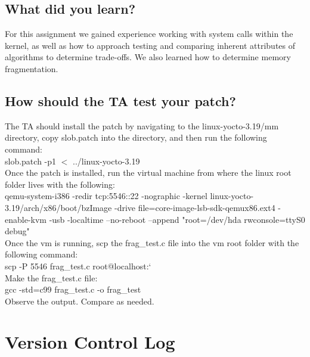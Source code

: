 \documentclass[onecolumn, draftclsnofoot,10pt, compsoc]{IEEEtran}
\begin{document}
\subsection{What did you learn?}
\noindent For this assignment we gained experience working with system calls within the kernel, as well as how to approach testing and comparing inherent attributes of algorithms to determine trade-offs. We also learned how to determine memory fragmentation.\\
\subsection{How should the TA test your patch?}
\noindent The TA should install the patch by navigating to the linux-yocto-3.19/mm directory, copy slob.patch into the directory, and then run the following command:\\

\noindent slob.patch -p1 $<$ ../linux-yocto-3.19 \\

\noindent Once the patch is installed, run the virtual machine from where the linux root folder lives with the following:\\

\noindent qemu-system-i386 -redir tcp:5546::22 -nographic -kernel linux-yocto-3.19/arch/x86/boot/bzImage -drive file=core-image-lsb-sdk-qemux86.ext4 -enable-kvm -usb -localtime --no-reboot --append "root=/dev/hda rwconsole=ttyS0 debug"\\

\noindent Once the vm is running, scp the frag\_test.c file into the vm root folder with the following command:\\

\noindent scp -P 5546 frag\_test.c root@localhost:\char`\~ \\

\noindent Make the frag\_test.c file:\\

\noindent gcc -std=c99 frag\_test.c -o frag\_test\\

\noindent Observe the output. Compare as needed.\\

\section{Version Control Log}
\end{document}
